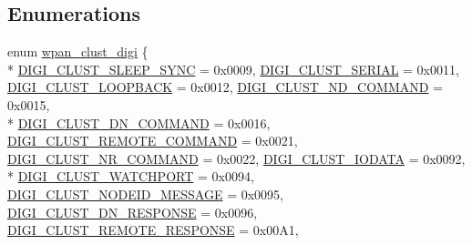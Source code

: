 \subsection*{Enumerations}
\begin{DoxyCompactItemize}
\item 
enum \hyperlink{group__wpan__aps_ga1227ab13b41d82d9c9c9080662f74cf7}{wpan\-\_\-clust\-\_\-digi} \{ \\*
\hyperlink{group__wpan__aps_gga1227ab13b41d82d9c9c9080662f74cf7ac46c70b2d273c05acf42fd4a19583187}{D\-I\-G\-I\-\_\-\-C\-L\-U\-S\-T\-\_\-\-S\-L\-E\-E\-P\-\_\-\-S\-Y\-N\-C} = 0x0009, 
\hyperlink{group__wpan__aps_gga1227ab13b41d82d9c9c9080662f74cf7a8208e143b452d11140e487d7d29eb38f}{D\-I\-G\-I\-\_\-\-C\-L\-U\-S\-T\-\_\-\-S\-E\-R\-I\-A\-L} = 0x0011, 
\hyperlink{group__wpan__aps_gga1227ab13b41d82d9c9c9080662f74cf7a378346cc570b606ab6984ade7e1ff01d}{D\-I\-G\-I\-\_\-\-C\-L\-U\-S\-T\-\_\-\-L\-O\-O\-P\-B\-A\-C\-K} = 0x0012, 
\hyperlink{group__wpan__aps_gga1227ab13b41d82d9c9c9080662f74cf7ae94c438b8e786806a840eb6cae8603fd}{D\-I\-G\-I\-\_\-\-C\-L\-U\-S\-T\-\_\-\-N\-D\-\_\-\-C\-O\-M\-M\-A\-N\-D} = 0x0015, 
\\*
\hyperlink{group__wpan__aps_gga1227ab13b41d82d9c9c9080662f74cf7a6606012ac5ed20a518f28ff156be7652}{D\-I\-G\-I\-\_\-\-C\-L\-U\-S\-T\-\_\-\-D\-N\-\_\-\-C\-O\-M\-M\-A\-N\-D} = 0x0016, 
\hyperlink{group__wpan__aps_gga1227ab13b41d82d9c9c9080662f74cf7aa637ec5b1224724b075a36eefa351126}{D\-I\-G\-I\-\_\-\-C\-L\-U\-S\-T\-\_\-\-R\-E\-M\-O\-T\-E\-\_\-\-C\-O\-M\-M\-A\-N\-D} = 0x0021, 
\hyperlink{group__wpan__aps_gga1227ab13b41d82d9c9c9080662f74cf7ae81533aa4490e5001cc0866c0572fc2e}{D\-I\-G\-I\-\_\-\-C\-L\-U\-S\-T\-\_\-\-N\-R\-\_\-\-C\-O\-M\-M\-A\-N\-D} = 0x0022, 
\hyperlink{group__wpan__aps_gga1227ab13b41d82d9c9c9080662f74cf7a66527ddc0653858888ce47c469c95349}{D\-I\-G\-I\-\_\-\-C\-L\-U\-S\-T\-\_\-\-I\-O\-D\-A\-T\-A} = 0x0092, 
\\*
\hyperlink{group__wpan__aps_gga1227ab13b41d82d9c9c9080662f74cf7a8d4df2bd5e335f87df0e038e803796ef}{D\-I\-G\-I\-\_\-\-C\-L\-U\-S\-T\-\_\-\-W\-A\-T\-C\-H\-P\-O\-R\-T} = 0x0094, 
\hyperlink{group__wpan__aps_gga1227ab13b41d82d9c9c9080662f74cf7ad19431fd18576cc8463e8ac362a8579c}{D\-I\-G\-I\-\_\-\-C\-L\-U\-S\-T\-\_\-\-N\-O\-D\-E\-I\-D\-\_\-\-M\-E\-S\-S\-A\-G\-E} = 0x0095, 
\hyperlink{group__wpan__aps_gga1227ab13b41d82d9c9c9080662f74cf7a1705862df524f4ecaab07a18a0b3f0d1}{D\-I\-G\-I\-\_\-\-C\-L\-U\-S\-T\-\_\-\-D\-N\-\_\-\-R\-E\-S\-P\-O\-N\-S\-E} = 0x0096, 
\hyperlink{group__wpan__aps_gga1227ab13b41d82d9c9c9080662f74cf7a84486276a61e57d2d2ff9a85d052fdb5}{D\-I\-G\-I\-\_\-\-C\-L\-U\-S\-T\-\_\-\-R\-E\-M\-O\-T\-E\-\_\-\-R\-E\-S\-P\-O\-N\-S\-E} = 0x00\-A1, 

\end{DoxyCompactItemize}
